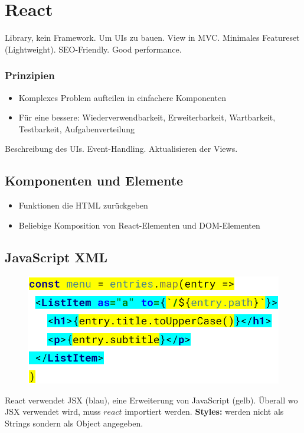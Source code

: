 
\section{React}
Library, kein Framework.
Um UIs zu bauen.
View in MVC.
Minimales Featureset (Lightweight). SEO-Friendly.
Good performance.

\subsubsection{Prinzipien}
\begin{itemize}
    \item Komplexes Problem aufteilen in einfachere Komponenten
    \item Für eine bessere: Wiederverwendbarkeit, Erweiterbarkeit, Wartbarkeit, Testbarkeit, Aufgabenverteilung
\end{itemize}
Beschreibung des UIs.
Event-Handling.
Aktualisieren der Views.

\subsection{Komponenten und Elemente}
\begin{itemize}
    \item Funktionen die HTML zurückgeben
    \item Beliebige Komposition von React-Elementen und DOM-Elementen
\end{itemize}

\subsection{JavaScript XML}
\begingroup
\setlength{\intextsep}{0pt}
\setlength{\columnsep}{5pt}
\begin{figure}
    \centering
    \includegraphics[width=\linewidth]{img/react_jsx.png}
\end{figure}
React verwendet JSX (blau), eine Erweiterung von JavaScript (gelb).
Überall wo JSX verwendet wird, muss $react$ importiert werden.
\textbf{Styles:} werden nicht als Strings sondern als Object angegeben.


